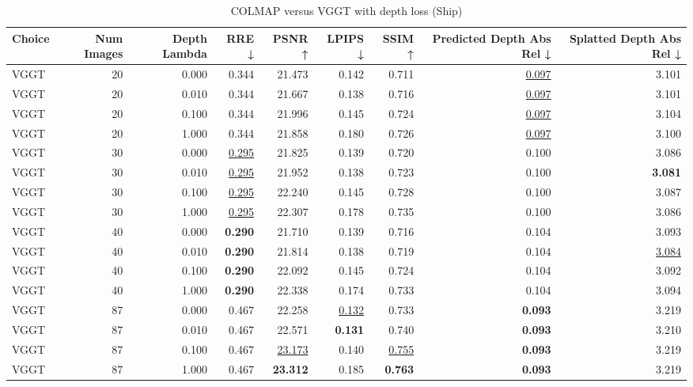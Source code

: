 \begin{table}[H]
\caption{COLMAP versus VGGT with depth loss (Ship)}
\label{tab:05_depth_lambda_num_images_ship}
\begin{tabular}{lrrrrrrrr}
\toprule
Choice & Num Images & Depth Lambda & RRE ↓ & PSNR ↑ & LPIPS ↓ & SSIM ↑ & Predicted Depth Abs Rel ↓ & Splatted Depth Abs Rel ↓ \\
\midrule
VGGT & 20 & 0.000 & 0.344 & 21.473 & 0.142 & 0.711 & \underline{0.097} & 3.101 \\
VGGT & 20 & 0.010 & 0.344 & 21.667 & 0.138 & 0.716 & \underline{0.097} & 3.101 \\
VGGT & 20 & 0.100 & 0.344 & 21.996 & 0.145 & 0.724 & \underline{0.097} & 3.104 \\
VGGT & 20 & 1.000 & 0.344 & 21.858 & 0.180 & 0.726 & \underline{0.097} & 3.100 \\
VGGT & 30 & 0.000 & \underline{0.295} & 21.825 & 0.139 & 0.720 & 0.100 & 3.086 \\
VGGT & 30 & 0.010 & \underline{0.295} & 21.952 & 0.138 & 0.723 & 0.100 & \textbf{3.081} \\
VGGT & 30 & 0.100 & \underline{0.295} & 22.240 & 0.145 & 0.728 & 0.100 & 3.087 \\
VGGT & 30 & 1.000 & \underline{0.295} & 22.307 & 0.178 & 0.735 & 0.100 & 3.086 \\
VGGT & 40 & 0.000 & \textbf{0.290} & 21.710 & 0.139 & 0.716 & 0.104 & 3.093 \\
VGGT & 40 & 0.010 & \textbf{0.290} & 21.814 & 0.138 & 0.719 & 0.104 & \underline{3.084} \\
VGGT & 40 & 0.100 & \textbf{0.290} & 22.092 & 0.145 & 0.724 & 0.104 & 3.092 \\
VGGT & 40 & 1.000 & \textbf{0.290} & 22.338 & 0.174 & 0.733 & 0.104 & 3.094 \\
VGGT & 87 & 0.000 & 0.467 & 22.258 & \underline{0.132} & 0.733 & \textbf{0.093} & 3.219 \\
VGGT & 87 & 0.010 & 0.467 & 22.571 & \textbf{0.131} & 0.740 & \textbf{0.093} & 3.210 \\
VGGT & 87 & 0.100 & 0.467 & \underline{23.173} & 0.140 & \underline{0.755} & \textbf{0.093} & 3.219 \\
VGGT & 87 & 1.000 & 0.467 & \textbf{23.312} & 0.185 & \textbf{0.763} & \textbf{0.093} & 3.219 \\
\bottomrule
\end{tabular}
\end{table}
